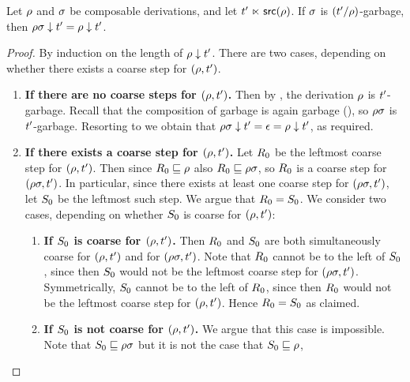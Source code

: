 \begin{lemma}
Let $\rho$ and $\sigma$ be composable derivations, and let $t' \mathrel{\ltimes} \mathsf{src}(\rho)$.
If $\sigma$ is $(t'/\rho)$-garbage, then $\rho\sigma \downarrow t' = \rho \downarrow t'$.
\end{lemma}
\begin{proof}
By induction on the length of $\rho \downarrow t'$.
There are two cases, depending on whether there exists a coarse step for $(\rho,t')$.
\begin{enumerate}
\item {\bf If there are no coarse steps for $(\rho,t')$.}
  Then by ,
  the derivation $\rho$ is $t'$-garbage.
  Recall that the composition of garbage is again garbage (),
  so $\rho\sigma$ is $t'$-garbage.
  Resorting to 
  we obtain that $\rho\sigma \downarrow t' = \epsilon = \rho \downarrow t'$,
  as required.
\item {\bf If there exists a coarse step for $(\rho,t')$.}
  Let $R_0$ be the leftmost coarse step for $(\rho,t')$.
  Then since $R_0 \sqsubseteq \rho$ also $R_0 \sqsubseteq \rho\sigma$,
  so $R_0$ is a coarse step for $(\rho\sigma,t')$.
  In particular, since there exists at least one coarse step for $(\rho\sigma,t')$,
  let $S_0$ be the leftmost such step.
  We argue that $R_0 = S_0$.
  We consider two cases, depending on whether $S_0$ is coarse for $(\rho,t')$:
  \begin{enumerate}
  \item {\bf If $S_0$ is coarse for $(\rho,t')$.}
    Then $R_0$ and $S_0$ are both simultaneously
    coarse for $(\rho,t')$ and for $(\rho\sigma,t')$.
    Note that $R_0$ cannot be to the left of $S_0$,
    since then $S_0$ would not be the leftmost coarse step for $(\rho\sigma,t')$.
    Symmetrically, $S_0$ cannot be to the left of $R_0$,
    since then $R_0$ would not be the leftmost coarse step for $(\rho,t')$.
    Hence $R_0 = S_0$ as claimed.
  \item {\bf If $S_0$ is not coarse for $(\rho,t')$.}
    We argue that this case is impossible.
    Note that $S_0 \sqsubseteq \rho\sigma$ but it is not the case that $S_0 \sqsubseteq \rho$,

\end{enumerate}
\end{enumerate}
\end{proof}
